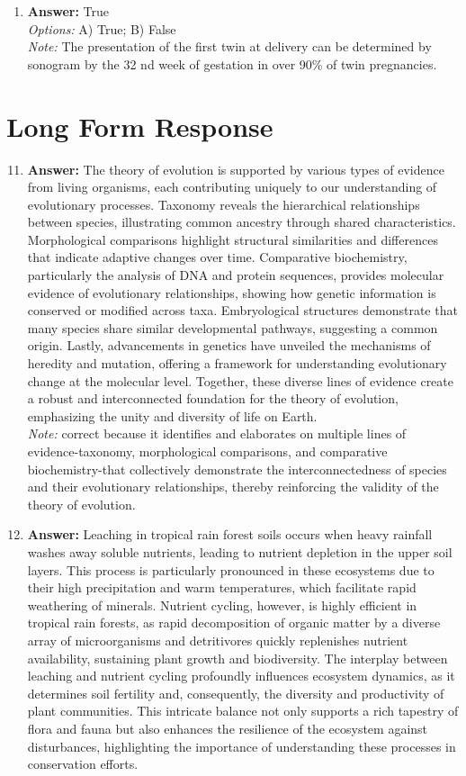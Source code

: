 \documentclass[12pt]{article}
\begin{document}
\begin{enumerate}[label=\arabic*.]
\item \textbf{Answer:} True
\\ \textit{Options:} A) True; B) False
\\ \textit{Note:} The presentation of the first twin at delivery can be determined by sonogram by the 32 nd week of gestation in over 90\% of twin pregnancies.
\end{enumerate}

\section*{Long Form Response}
\begin{enumerate}[label=\arabic*.]
\setcounter{enumi}{10}
\item \textbf{Answer:} The theory of evolution is supported by various types of evidence from living organisms, each contributing uniquely to our understanding of evolutionary processes. Taxonomy reveals the hierarchical relationships between species, illustrating common ancestry through shared characteristics. Morphological comparisons highlight structural similarities and differences that indicate adaptive changes over time. Comparative biochemistry, particularly the analysis of DNA and protein sequences, provides molecular evidence of evolutionary relationships, showing how genetic information is conserved or modified across taxa. Embryological structures demonstrate that many species share similar developmental pathways, suggesting a common origin. Lastly, advancements in genetics have unveiled the mechanisms of heredity and mutation, offering a framework for understanding evolutionary change at the molecular level. Together, these diverse lines of evidence create a robust and interconnected foundation for the theory of evolution, emphasizing the unity and diversity of life on Earth.
\\ \textit{Note:} correct because it identifies and elaborates on multiple lines of evidence-taxonomy, morphological comparisons, and comparative biochemistry-that collectively demonstrate the interconnectedness of species and their evolutionary relationships, thereby reinforcing the validity of the theory of evolution.
\item \textbf{Answer:} Leaching in tropical rain forest soils occurs when heavy rainfall washes away soluble nutrients, leading to nutrient depletion in the upper soil layers. This process is particularly pronounced in these ecosystems due to their high precipitation and warm temperatures, which facilitate rapid weathering of minerals. Nutrient cycling, however, is highly efficient in tropical rain forests, as rapid decomposition of organic matter by a diverse array of microorganisms and detritivores quickly replenishes nutrient availability, sustaining plant growth and biodiversity. The interplay between leaching and nutrient cycling profoundly influences ecosystem dynamics, as it determines soil fertility and, consequently, the diversity and productivity of plant communities. This intricate balance not only supports a rich tapestry of flora and fauna but also enhances the resilience of the ecosystem against disturbances, highlighting the importance of understanding these processes in conservation efforts.

\end{enumerate}
\end{document}
